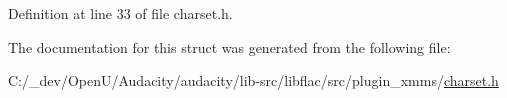 Definition at line 33 of file charset.\+h.



The documentation for this struct was generated from the following file\+:\begin{DoxyCompactItemize}
\item 
C\+:/\+\_\+dev/\+Open\+U/\+Audacity/audacity/lib-\/src/libflac/src/plugin\+\_\+xmms/\hyperlink{plugin__xmms_2charset_8h}{charset.\+h}\end{DoxyCompactItemize}

